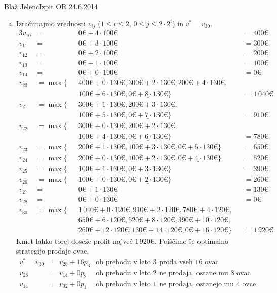 \begin{naloga}{Blaž Jelenc}{Izpit OR 24.6.2014}
\begin{odgovor}
\begin{enumerate}[(a)]
\item Izračunajmo vrednosti $v_{ij}$ ($1 \le i \le 2$, $0 \le j \le 2 \cdot 2^i$) in $v^* = v_{30}$.
\begin{alignat*}{3}
v_{10} &=&& 0 € + 4 \cdot 100 € &&= 400 € \\
v_{11} &=&& 0 € + 3 \cdot 100 € &&= 300 € \\
v_{12} &=&& 0 € + 2 \cdot 100 € &&= 200 € \\
v_{13} &=&& 0 € + 1 \cdot 100 € &&= 100 € \\
v_{14} &=&& 0 € + 0 \cdot 100 € &&= 0 € \\
v_{20} &= \max\{&&{} 400 € + 0 \cdot 130 €, 300 € + 2 \cdot 130 €, 200 € + 4 \cdot 130 €, \\
&&&{} 100 € + 6 \cdot 130 €, \underline{0 € + 8 \cdot 130 €}\} &&= 1\,040 € \\
v_{21} &= \max\{&&{} 300 € + 1 \cdot 130 €, 200 € + 3 \cdot 130 €, \\
&&&{} 100 € + 5 \cdot 130 €, \underline{0 € + 7 \cdot 130 €}\} &&= 910 € \\
v_{22} &= \max\{&&{} 300 € + 0 \cdot 130 €, 200 € + 2 \cdot 130 €, \\
&&&{} 100 € + 4 \cdot 130 €, \underline{0 € + 6 \cdot 130 €}\} &&= 780 € \\
v_{23} &= \max\{&&{} 200 € + 1 \cdot 130 €, 100 € + 3 \cdot 130 €, \underline{0 € + 5 \cdot 130 €}\} &&= 650 € \\
v_{24} &= \max\{&&{} 200 € + 0 \cdot 130 €, 100 € + 2 \cdot 130 €, \underline{0 € + 4 \cdot 130 €}\} &&= 520 € \\
v_{25} &= \max\{&&{} 100 € + 1 \cdot 130 €, \underline{0 € + 3 \cdot 130 €}\} &&= 390 € \\
v_{26} &= \max\{&&{} 100 € + 0 \cdot 130 €, \underline{0 € + 2 \cdot 130 €}\} &&= 260 € \\
v_{27} &=&& 0 € + 1 \cdot 130 € &&= 130 € \\
v_{28} &=&& 0 € + 0 \cdot 130 € &&= 0 € \\
v_{30} &= \max\{&&{} 1\,040 € + 0 \cdot 120 €, 910 € + 2 \cdot 120 €, 780 € + 4 \cdot 120 €, \\
&&&{} 650 € + 6 \cdot 120 €, 520 € + 8 \cdot 120 €, 390 € + 10 \cdot 120 €, \\
&&&{} 260 € + 12 \cdot 120 €, 130 € + 14 \cdot 120 €, \underline{0 € + 16 \cdot 120 €}\} &&= 1\,920 €
\end{alignat*}
Kmet lahko torej doseže profit največ $1\,920 €$.
Poiščimo še optimalno strategijo prodaje ovac.
\begin{align*}
v^* = v_{30} &= v_{28} + 16 p_3 & \text{ob prehodu v leto $3$ proda vseh $16$ ovac} \\
v_{28} &= v_{14} + 0 p_2 & \text{ob prehodu v leto $2$ ne prodaja, ostane mu $8$ ovac} \\
v_{14} &= v_{02} + 0 p_1 & \text{ob prehodu v leto $1$ ne prodaja, ostanejo mu $4$ ovce}
\end{align*}
\end{enumerate}
\end{odgovor}
\end{naloga}
